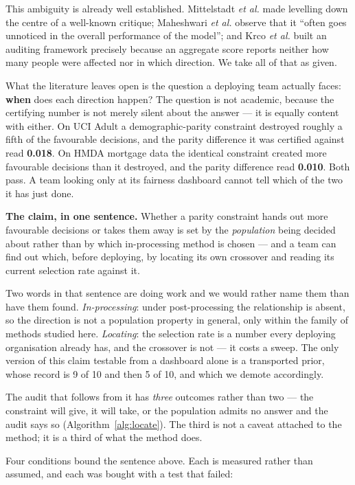 \documentclass[conference]{IEEEtran}
\begin{document}
This ambiguity is already well established. Mittelstadt \emph{et al.} \cite{mittelstadt2023}
made levelling down the centre of a well-known critique; Maheshwari \emph{et al.}
\cite{maheshwari2023} observe that it ``often goes unnoticed in the overall performance of
the model''; and Krco \emph{et al.} \cite{ferry2023} built an auditing framework precisely
because an aggregate score reports neither how many people were affected nor in which
direction. We take all of that as given.

What the literature leaves open is the question a deploying team actually faces:
\textbf{when} does each direction happen? The question is not academic, because the
certifying number is not merely silent about the answer --- it is equally content with
either. On UCI Adult a demographic-parity constraint destroyed roughly a fifth of the
favourable decisions, and the parity difference it was certified against read
\textbf{0.018}. On HMDA mortgage data the identical constraint created more favourable
decisions than it destroyed, and the parity difference read \textbf{0.010}. Both pass. A
team looking only at its fairness dashboard cannot tell which of the two it has just done.

\textbf{The claim, in one sentence.} Whether a parity constraint hands out more favourable
decisions or takes them away is set by the \emph{population} being decided about rather than
by which in-processing method is chosen --- and a team can find out which, before deploying,
by locating its own crossover and reading its current selection rate against it.

Two words in that sentence are doing work and we would rather name them than have them found.
\emph{In-processing}: under post-processing the relationship is absent, so the direction is
not a population property in general, only within the family of methods studied here.
\emph{Locating}: the selection rate is a number every deploying organisation already has, and
the crossover is not --- it costs a sweep. The only version of this claim testable from a
dashboard alone is a transported prior, whose record is 9 of 10 and then 5 of 10, and which we
demote accordingly.

The audit that follows from it has \emph{three} outcomes rather than two --- the constraint
will give, it will take, or the population admits no answer and the audit says so
(Algorithm~\ref{alg:locate}). The third is not a caveat attached to the method; it is a third
of what the method does.

Four conditions bound the sentence above. Each is measured rather than assumed, and each was
bought with a test that failed:
\end{document}
